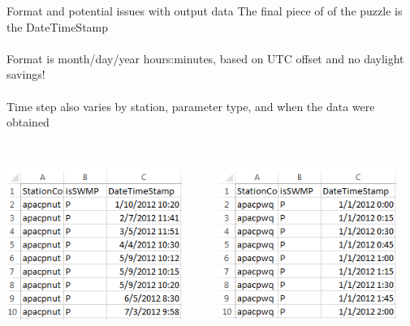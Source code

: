\documentclass[xcolor=svgnames]{beamer}\usepackage[]{graphicx}\usepackage[]{color}
\begin{document}
\begin{frame}{Format and potential issues with output data}
The final piece of of the puzzle is the DateTimeStamp \\~\\
Format is month/day/year hours:minutes, based on UTC offset and no daylight savings!\\~\\
Time step also varies by station, parameter type, and when the data were obtained \\~\\
\begin{columns}[t]
\begin{column}{0.4\textwidth}
\centerline{\includegraphics[width = 0.9\textwidth]{timestamp_ex1.png}}
\end{column}
\begin{column}{0.4\textwidth}
\centerline{\includegraphics[width = 0.9\textwidth]{timestamp_ex2.png}}
\end{column}
\end{columns}
\end{frame}
\end{document}
